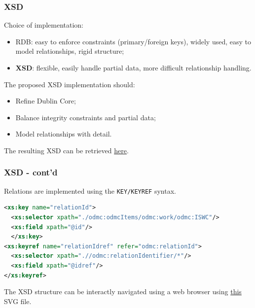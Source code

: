 \documentclass{beamer}
\newcommand\rb[1]{\textcolor{ThemeRed}{\textbf{#1}}}
\begin{document}
  \begin{frame}
    \frametitle{XSD}

    Choice of implementation:

    \vspace{0.5em}

    \begin{itemize}
      \item RDB: easy to enforce constraints (primary/foreign keys), widely used, easy to model relationships, rigid structure;
      \item \rb{XSD}: flexible, easily handle partial data, more difficult relationship handling.
    \end{itemize}

    \vspace{1.5em}

    The proposed XSD implementation should:

    \vspace{0.5em}

    \begin{itemize}
      \item Refine Dublin Core;
      \item Balance integrity constraints and partial data;
      \item Model relationships with detail. 
    \end{itemize}

    \vspace{1.5em}

    The resulting XSD can be retrieved \href{https://github.com/pindri/ODMC_exam/blob/master/odmc.xsd}{here}.
  \end{frame}


  
  \begin{frame}[fragile]
    \frametitle{XSD - cont'd}
    
    Relations are implemented using the \texttt{KEY/KEYREF} syntax.
    
    \vspace{1em}
    
    \lstset{basicstyle=\scriptsize\ttfamily}
\begin{lstlisting}[language=XML]
<xs:key name="relationId">
  <xs:selector xpath="./odmc:odmcItems/odmc:work/odmc:ISWC"/>
  <xs:field xpath="@id"/>
  </xs:key>
<xs:keyref name="relationIdref" refer="odmc:relationId">
  <xs:selector xpath=".//odmc:relationIdentifier/*"/>
  <xs:field xpath="@idref"/>
</xs:keyref>
\end{lstlisting}

    \vspace{1em}
    
    The XSD structure can be interactly navigated using a web browser using \href{https://github.com/pindri/ODMC_exam/blob/master/odmc.svg}{this} SVG file.
    
  \end{frame}
\end{document}
